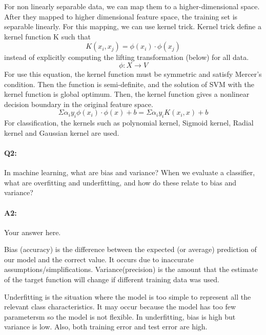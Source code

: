 For non linearly separable data, we can map them to a higher-dimensional space. After they mapped to higher dimensional feature space, the training set is separable linearly. For this mapping, we can use kernel trick. Kernel trick define a kernel function K such that
\begin{equation}
K(x_{i}, x_{j} ) =\phi(x_{i} ) \cdot \phi (x_{j} )
\end{equation}
instead of explicitly computing the lifting transformation (below) for all data.
\begin{equation}
    \phi:X \rightarrow V
\end{equation}
For use this equation, the kernel function must be symmetric and satisfy Mercer's condition. Then the function is semi-definite, and the solution of SVM with the kernel function is global optimum. Then, the kernel function gives a nonlinear decision boundary in the original feature space.
\begin{equation}
    \Sigma\alpha_{i}y_{i}\phi(x_{i})\cdot\phi(x) + b = \Sigma\alpha_{i}y_{i}K(x_{i}, x) + b
\end{equation}
For classification, the kernels such as polynomial kernel, Sigmoid kernel, Radial kernel and Gaussian kernel are used.


\pagebreak
\paragraph{Q2:} In machine learning, what are bias and variance? When we evaluate a classifier, what are overfitting and underfitting, and how do these relate to bias and variance?

\paragraph{A2:} Your answer here.


Bias (accuracy) is the difference between the expected (or average) prediction of our model and the correct value. It occurs due to inaccurate assumptions/simplifications. Variance(precision) is the amount that the estimate of the target function will change if different training data was used.

Underfitting is the situation where the model is too simple to represent all the relevant class characteristics. It may occur because the model has too few parametersm so the model is not flexible. In underfitting, bias is high but variance is low. Also, both training error and test error are high.

